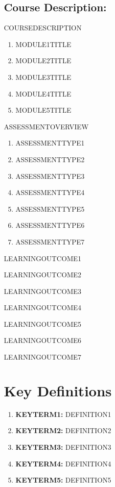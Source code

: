\documentclass{article}
\begin{document}
\subsection{Course Description:} 

COURSEDESCRIPTION

\begin{enumerate}
\item MODULE1TITLE

\item MODULE2TITLE

\item MODULE3TITLE

\item MODULE4TITLE

\item MODULE5TITLE
\end{enumerate}

ASSESSMENTOVERVIEW

\begin{enumerate}
	
\item ASSESSMENTTYPE1
 
\item ASSESSMENTTYPE2
 
\item ASSESSMENTTYPE3
 
\item ASSESSMENTTYPE4
 
 \item ASSESSMENTTYPE5
 
 \item ASSESSMENTTYPE6
 
 \item ASSESSMENTTYPE7
 
\end{enumerate}

LEARNINGOUTCOME1

LEARNINGOUTCOME2

LEARNINGOUTCOME3

LEARNINGOUTCOME4

LEARNINGOUTCOME5

LEARNINGOUTCOME6

LEARNINGOUTCOME7

\pagebreak
 
\section{Key Definitions}
\begin{enumerate}
	\item \textbf{KEYTERM1:} DEFINITION1
	\item \textbf{KEYTERM2:} DEFINITION2
	\item \textbf{KEYTERM3:} DEFINITION3
	\item \textbf{KEYTERM4:} DEFINITION4
	\item \textbf{KEYTERM5:} DEFINITION5
\end{enumerate}
\end{document}
